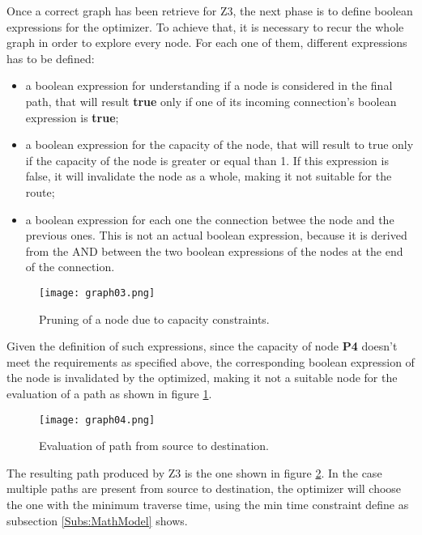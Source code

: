 Once a correct graph has been retrieve for Z3, the next phase is to define boolean expressions for the optimizer. To achieve that, it is necessary to recur the whole graph in order to explore every node. For each one of them, different expressions has to be defined:
\begin{itemize}
  \item a boolean expression for understanding if a node is considered in the final path, that will result \textbf{true} only if one of its incoming connection's boolean expression is \textbf{true};
  \item a boolean expression for the capacity of the node, that will result to true only if the capacity of the node is greater or equal than 1. If this expression is false, it will invalidate the node as a whole, making it not suitable for the route;
  \item a boolean expression for each one the connection betwee the node and the previous ones. This is not an actual boolean expression, because it is derived from the AND between the two boolean expressions of the nodes at the end of the connection.
\end{itemize}
\begin{figure}[!htb]
   \centering
   \texttt{[image: graph03.png]}
   \caption{Pruning of a node due to capacity constraints.}\label{Fig:Graph03}
\end{figure}
Given the definition of such expressions, since the capacity of node \textbf{P4} doesn't meet the requirements as specified above, the corresponding boolean expression of the node is invalidated by the optimized, making it not a suitable node for the evaluation of a path as shown in figure \ref{Fig:Graph03}.
\begin{figure}[!htb]
   \centering
   \texttt{[image: graph04.png]}
   \caption{Evaluation of path from source to destination.}\label{Fig:Graph04}
\end{figure}
The resulting path produced by Z3 is the one shown in figure \ref{Fig:Graph04}. In the case multiple paths are present from source to destination, the optimizer will choose the one with the minimum traverse time, using the min time constraint define as subsection \ref{Subs:MathModel} shows.

